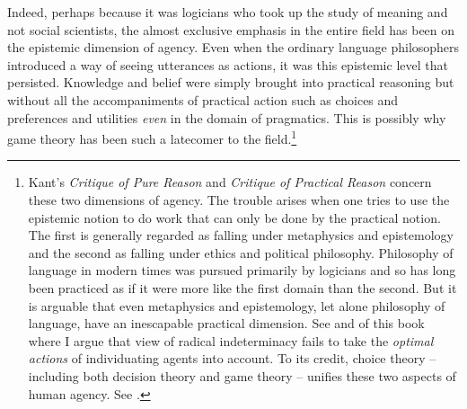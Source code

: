 %
%
%
%


Indeed, perhaps because it was logicians who took up the study of meaning and not social scientists, the almost exclusive emphasis in the entire field has been on the epistemic dimension of agency. Even when the ordinary language philosophers introduced a way of seeing utterances as actions, it was this epistemic level that persisted. Knowledge and belief were simply brought into practical reasoning but without all the accompaniments of practical action such as choices and preferences and utilities \emph{even} in the domain of pragmatics. This is possibly why game theory has been such a latecomer to the field.\footnote{Kant's \emph{Critique of Pure Reason} and \emph{Critique of Practical Reason} concern these two dimensions of agency. The trouble arises when one tries to use the epistemic notion to do work that can only be done by the practical notion. The first is generally regarded as falling under metaphysics and epistemology and the second as falling under ethics and political philosophy. Philosophy of language in modern times was pursued primarily by logicians and so has long been practiced as if it were more like the first domain than the second. But it is arguable that even metaphysics and epistemology, let alone philosophy of language, have an inescapable practical dimension. See \citet[Section~7.6]{parikh:le} and  of this book where I argue that  view of radical indeterminacy fails to take the \emph{optimal actions} of individuating agents into account. To its credit, choice theory -- including both decision theory and game theory -- unifies these two aspects of human agency. See \citet{myerson:gt}.}


